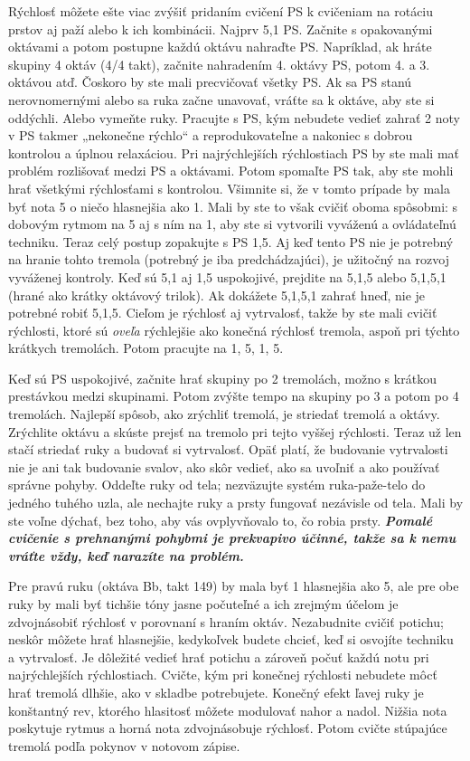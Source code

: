 \documentclass[11pt,a4paper%
]{book}
\begin{document}
Rýchlosť môžete ešte viac zvýšiť pridaním cvičení PS k cvičeniam na rotáciu prstov aj paží alebo k ich kombinácii. Najprv 5,1 PS. Začnite s opakovanými oktávami a potom postupne každú oktávu nahraďte PS. Napríklad, ak hráte skupiny 4 oktáv (4/4 takt), začnite nahradením 4. oktávy PS, potom 4. a 3. oktávou atď. Čoskoro by ste mali precvičovať všetky PS. Ak sa PS stanú nerovnomernými alebo sa ruka začne unavovať, vráťte sa k oktáve, aby ste si oddýchli. Alebo vymeňte ruky. Pracujte s PS, kým nebudete vedieť zahrať 2 noty v PS takmer „nekonečne rýchlo`` a reprodukovateľne a nakoniec s dobrou kontrolou a úplnou relaxáciou. Pri najrýchlejších rýchlostiach PS by ste mali mať problém rozlišovať medzi PS a oktávami. Potom spomaľte PS tak, aby ste mohli hrať všetkými rýchlosťami s kontrolou. Všimnite si, že v tomto prípade by mala byť nota 5 o niečo hlasnejšia ako 1. Mali by ste to však cvičiť oboma spôsobmi: s dobovým rytmom na 5 aj s ním na 1, aby ste si vytvorili vyváženú a ovládateľnú techniku. Teraz celý postup zopakujte s PS 1,5. Aj keď tento PS nie je potrebný na hranie tohto tremola (potrebný je iba predchádzajúci), je užitočný na rozvoj vyváženej kontroly. Keď sú 5,1 aj 1,5 uspokojivé, prejdite na 5,1,5 alebo 5,1,5,1 (hrané ako krátky oktávový trilok). Ak dokážete 5,1,5,1 zahrať hneď, nie je potrebné robiť 5,1,5. Cieľom je rýchlosť aj vytrvalosť, takže by ste mali cvičiť rýchlosti, ktoré sú \emph{oveľa} rýchlejšie ako konečná rýchlosť tremola, aspoň pri týchto krátkych tremolách. Potom pracujte na 1, 5, 1, 5.

Keď sú PS uspokojivé, začnite hrať skupiny po 2 tremolách, možno s krátkou prestávkou medzi skupinami. Potom zvýšte tempo na skupiny po 3 a potom po 4 tremolách. Najlepší spôsob, ako zrýchliť tremolá, je striedať tremolá a oktávy. Zrýchlite oktávu a skúste prejsť na tremolo pri tejto vyššej rýchlosti. Teraz už len stačí striedať ruky a budovať si vytrvalosť. Opäť platí, že budovanie vytrvalosti nie je ani tak budovanie svalov, ako skôr vedieť, ako sa uvoľniť a ako používať správne pohyby. Oddeľte ruky od tela; nezväzujte systém ruka-paže-telo do jedného tuhého uzla, ale nechajte ruky a prsty fungovať nezávisle od tela. Mali by ste voľne dýchať, bez toho, aby vás ovplyvňovalo to, čo robia prsty. \emph{\textbf{Pomalé cvičenie s prehnanými pohybmi je prekvapivo účinné, takže sa k nemu vráťte vždy, keď narazíte na problém.}}

Pre pravú ruku (oktáva Bb, takt 149) by mala byť 1 hlasnejšia ako 5, ale pre obe ruky by mali byť tichšie tóny jasne počuteľné a ich zrejmým účelom je zdvojnásobiť rýchlosť v porovnaní s hraním oktáv. Nezabudnite cvičiť potichu; neskôr môžete hrať hlasnejšie, kedykoľvek budete chcieť, keď si osvojíte techniku a vytrvalosť. Je dôležité vedieť hrať potichu a zároveň počuť každú notu pri najrýchlejších rýchlostiach. Cvičte, kým pri konečnej rýchlosti nebudete môcť hrať tremolá dlhšie, ako v skladbe potrebujete. Konečný efekt ľavej ruky je konštantný rev, ktorého hlasitosť môžete modulovať nahor a nadol. Nižšia nota poskytuje rytmus a horná nota zdvojnásobuje rýchlosť. Potom cvičte stúpajúce tremolá podľa pokynov v notovom zápise.
\end{document}
